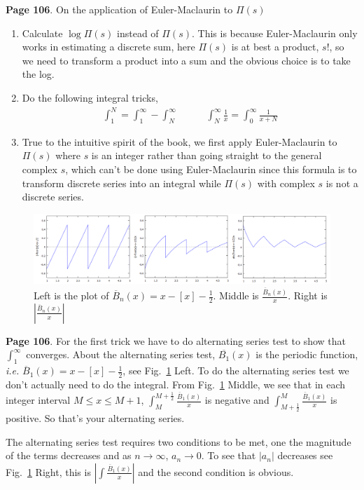 \documentclass[aps,preprint,preprintnumbers,nofootinbib,showpacs,prd]{revtex4-1}
\newcommand{\ie}{{\it i.e.} }
\newcommand{\nbea}{\begin{eqnarray*}}
\newcommand{\neea}{\end{eqnarray*}}
\begin{document}
{\bf Page 106}. On the application of Euler-Maclaurin to $\Pi(s)$
%
\begin{enumerate}
\item Calculate $\log \Pi(s)$ instead of $\Pi(s)$. This is because Euler-Maclaurin only works in estimating a discrete sum, here $\Pi(s)$ is at best a product, $s!$, so we need to transform a product into a sum and the obvious choice is to take the log.
%
\item Do the following integral tricks, 
%
\nbea
\int_1^N = \int_1^\infty - \int_N^\infty ~~~~~~~~~~~~~ \int_N^\infty \frac{1}{x} = \int_0^\infty \frac{1}{x + N}
\neea
%
\item True to the intuitive spirit of the book, we first apply Euler-Maclaurin to $\Pi(s)$ where $s$ is an integer rather than going straight to the general complex $s$, which can't be done using Euler-Maclaurin since this formula is to transform discrete series into an integral while $\Pi(s)$ with complex $s$ is not a discrete series.
\end{enumerate}
%
%
\begin{figure}
\centering
  \includegraphics[width=1.00\linewidth]{B_over_x.png}
  \caption{Left is the plot of $\overline{B}_n(x) = x - [x]  -\frac{1}{2}$. Middle is $\frac{\overline{B}_n(x)}{x}$. Right is $\left|\frac{\overline{B}_n(x)}{x}\right|$}
\label{fig:B_over_x}
\end{figure}
%
{\bf Page 106}. For the first trick we have to do alternating series test to show that $\int_1^\infty$ converges. About the alternating series test, $\overline{B_1}(x)$ is the periodic function, \ie $\overline{B}_1(x) = x - [x] - \frac{1}{2}$, see Fig.~\ref{fig:B_over_x} Left. To do the alternating series test we don't actually need to do the integral. From Fig.~\ref{fig:B_over_x} Middle, we see that in each integer interval $M \le x \le M+1$, $\int_M^{M+\frac{1}{2}} \frac{\overline{B}_1(x)}{x}$ is negative and $\int_{M+\frac{1}{2}}^M \frac{\overline{B}_1(x)}{x}$ is positive. So that's your alternating series.

The alternating series test requires two conditions to be met, one the magnitude of the terms decreases and as $n\to \infty$, $a_n \to 0$. To see that $|a_n|$ decreases see Fig.~\ref{fig:B_over_x} Right, this is $ \left|\int\frac{\overline{B}_1(x)}{x}\right|$ and the second condition is obvious.
\end{document}
